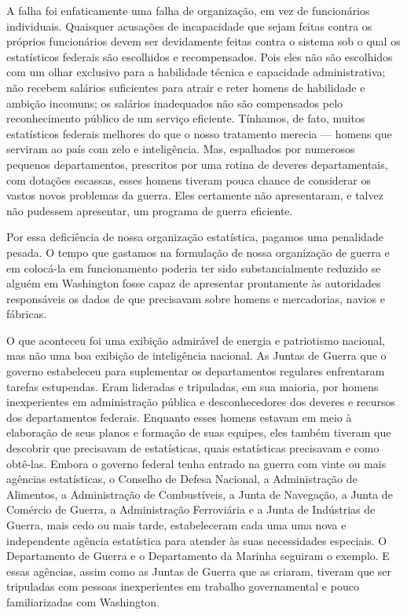 \documentclass[12pt]{article}
\begin{document}
A falha foi enfaticamente uma falha de organização, em vez de funcionários individuais. Quaisquer acusações de incapacidade que sejam feitas contra os próprios funcionários devem ser devidamente feitas contra o sistema sob o qual os estatísticos federais são escolhidos e recompensados. Pois eles não são escolhidos com um olhar exclusivo para a habilidade técnica e capacidade administrativa; não recebem salários suficientes para atrair e reter homens de habilidade e ambição incomuns; os salários inadequados não são compensados pelo reconhecimento público de um serviço eficiente. Tínhamos, de fato, muitos estatísticos federais melhores do que o nosso tratamento merecia — homens que serviram ao país com zelo e inteligência. Mas, espalhados por numerosos pequenos departamentos, prescritos por uma rotina de deveres departamentais, com dotações escassas, esses homens tiveram pouca chance de considerar os vastos novos problemas da guerra. Eles certamente não apresentaram, e talvez não pudessem apresentar, um programa de guerra eficiente.

Por essa deficiência de nossa organização estatística, pagamos uma penalidade pesada. O tempo que gastamos na formulação de nossa organização de guerra e em colocá-la em funcionamento poderia ter sido substancialmente reduzido se alguém em Washington fosse capaz de apresentar prontamente às autoridades responsáveis os dados de que precisavam sobre homens e mercadorias, navios e fábricas.

O que aconteceu foi uma exibição admirável de energia e patriotismo nacional, mas não uma boa exibição de inteligência nacional. As Juntas de Guerra que o governo estabeleceu para suplementar os departamentos regulares enfrentaram tarefas estupendas. Eram lideradas e tripuladas, em sua maioria, por homens inexperientes em administração pública e desconhecedores dos deveres e recursos dos departamentos federais. Enquanto esses homens estavam em meio à elaboração de seus planos e formação de suas equipes, eles também tiveram que descobrir que precisavam de estatísticas, quais estatísticas precisavam e como obtê-las. Embora o governo federal tenha entrado na guerra com vinte ou mais agências estatísticas, o Conselho de Defesa Nacional, a Administração de Alimentos, a Administração de Combustíveis, a Junta de Navegação, a Junta de Comércio de Guerra, a Administração Ferroviária e a Junta de Indústrias de Guerra, mais cedo ou mais tarde, estabeleceram cada uma uma nova e independente agência estatística para atender às suas necessidades especiais. O Departamento de Guerra e o Departamento da Marinha seguiram o exemplo. E essas agências, assim como as Juntas de Guerra que as criaram, tiveram que ser tripuladas com pessoas inexperientes em trabalho governamental e pouco familiarizadas com Washington.
\end{document}
